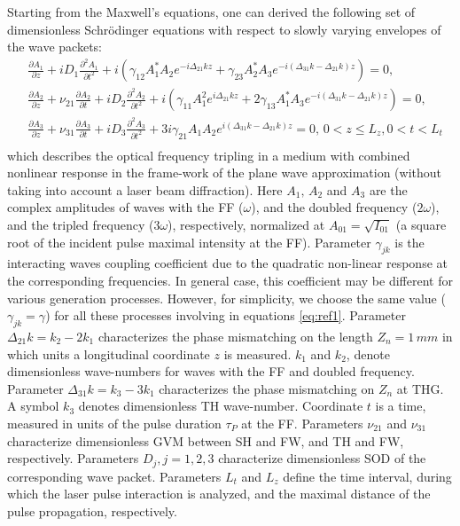 \documentclass[a4paper, 12pt, onecolumn]{extarticle}
\begin{document}
Starting from the Maxwell's equations,  one can derived the following set of dimensionless Schr\"{o}dinger equations with respect to slowly varying envelopes of the wave packets: 
\begin{equation}
\label{eq:ref1}
\begin{aligned}
&\frac{\partial{A_1}}{\partial{z}}+iD_1\frac{\partial^2{A_1}}{\partial{t^2}}+i\left(\gamma_{12} A_1^* A_2e^{-i\Delta_{21} kz}+\gamma_{23} A_2^* A_3e^{-i(\Delta_{31}k-\Delta_{21}k)z}\right)=0,\\
&\frac{\partial{A_2}}{\partial{z}}+\nu_{21} \frac{\partial A_2}{\partial t}+iD_2\frac{\partial^2{A_2}}{\partial{t^2}}+i\left(\gamma_{11}A_1^2e^{i\Delta_{21} kz}+2\gamma_{13}A_1^*A_3e^{-i(\Delta_{31}k-\Delta_{21}k)z}\right)=0,\\
&\frac{\partial{A_3}}{\partial{z}}+\nu_{31} \frac{\partial A_3}{\partial t}+iD_3\frac{\partial^2{A_3}}{\partial{t^2}}+3i\gamma_{21} A_1 A_2e^{i(\Delta_{31}k-\Delta_{21}k)z}=0,\, 0< z \leq L_z , 0<t<L_t\\
\end{aligned}
\end{equation}
which describes the optical frequency tripling in a medium with combined nonlinear response in the frame-work of the plane wave approximation (without taking into account a laser beam diffraction). 
Here \(A_1,\,A_2\) and \(A_3\) are the complex amplitudes of waves with the FF (\(\omega\)), and the doubled frequency (\(2\omega\)), and the tripled frequency (\(3\omega\)), respectively, normalized at \(A_{01}=\sqrt{I_{01}}\) (a square root of the incident pulse maximal intensity at the FF). Parameter \(\gamma_{jk}\) is the interacting waves coupling coefficient  due to the quadratic non-linear response at the corresponding frequencies.  In general case, this coefficient may be different for various generation processes. However, for simplicity, we choose the same value (\(\gamma_{jk}=\gamma\)) for all these processes involving in equations \eqref{eq:ref1}. Parameter \(\Delta_{21} k=k_2 - 2k_1\)  characterizes the phase mismatching on the length $Z_n=1\,mm$ in which units a longitudinal coordinate $z$ is measured. \(k_1\) and \(k_2\), denote dimensionless wave-numbers for waves with the FF and doubled frequency. Parameter \(\Delta_{31} k=k_3 - 3k_1\) characterizes the phase mismatching on $Z_n$ at THG. A symbol \(k_3\) denotes dimensionless TH wave-number. Coordinate \(t\) is a time, measured in units of the pulse duration \(\tau_P\) at the FF. Parameters \(\nu_{21}\) and \(\nu_{31}\) characterize dimensionless GVM between SH and FW, and TH and FW, respectively. Parameters \(D_{j}, j=1,2,3\) characterize dimensionless SOD of the corresponding wave packet. Parameters \(L_t\) and \(L_z\) define the time interval, during which the laser pulse interaction is analyzed, and the maximal distance of the pulse propagation, respectively.
\end{document}
